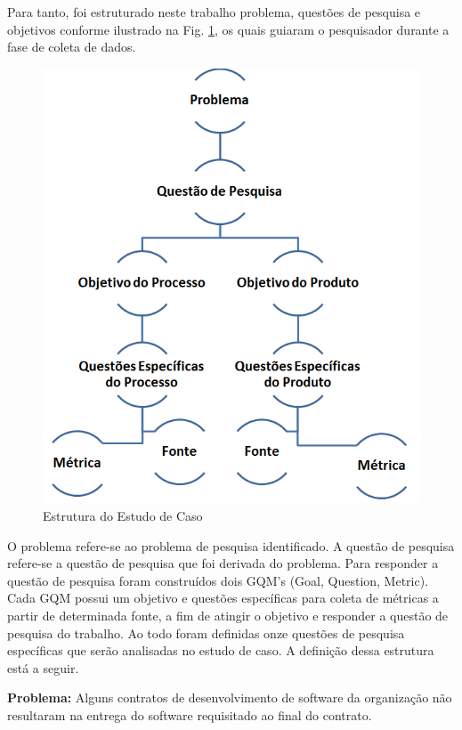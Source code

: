 Para tanto, foi estruturado neste trabalho problema, questões de pesquisa e objetivos conforme ilustrado na Fig. \ref{estrutura}, os quais guiaram o pesquisador durante a fase de coleta de dados.

\begin{figure}[H]
		\centering
		
			\includegraphics[scale=1.0]{figuras/estruturaEstudo.png}
		\caption{Estrutura do Estudo de Caso}
		\label{estrutura}
	\end{figure}

O problema refere-se ao problema de pesquisa identificado. A questão de pesquisa refere-se a questão de pesquisa que foi derivada do problema. Para responder a questão de pesquisa foram construídos dois GQM's (Goal, Question, Metric). Cada GQM possui um objetivo e questões específicas para coleta de métricas a partir de determinada fonte, a fim de atingir o objetivo e responder a questão de pesquisa do trabalho. Ao todo foram definidas onze questões de pesquisa específicas que serão analisadas no estudo de caso. A definição dessa estrutura está a seguir.

\textbf{Problema:} Alguns contratos de desenvolvimento de software da organização não resultaram na entrega do software requisitado ao final do contrato.

